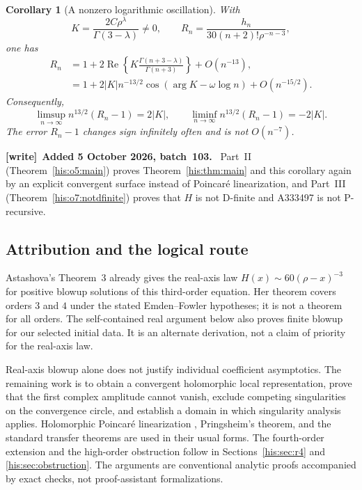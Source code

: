\documentclass[11pt]{article}
\newtheorem{corollary}[theorem]{Corollary}
\theoremstyle{remark}\newtheorem{remark}[theorem]{Remark}
\DeclareMathOperator{\Rea}{Re}
\newcommand{\la}{\lambda}
\numberwithin{equation}{section}
\newenvironment{writenote}[1][]{\par\smallskip\begingroup\small
 \noindent\textbf{[write]}\if\relax\detokenize{#1}\relax\else~\textbf{#1.}\fi\ }%
 {\par\endgroup\smallskip}
\begin{document}
\begin{corollary}[A nonzero logarithmic oscillation]\label{his:cor:oscillation}
With
\begin{equation}\label{his:eq:K}
 K=\frac{2C\rho^\la}{\Gamma(3-\la)}\ne0,\qquad
 R_n=\frac{h_n}{30(n+2)!\rho^{-n-3}},
\end{equation}
one has
\begin{align}
 R_n&=1+2\Rea\left\{K\frac{\Gamma(n+3-\la)}{\Gamma(n+3)}\right\}
       +O(n^{-13}),\label{his:eq:first-exact}\\
 &=1+2|K|n^{-13/2}\cos(\arg K-\omega\log n)
       +O(n^{-15/2}).\label{his:eq:first-simple}
\end{align}
Consequently,
\begin{equation}\label{his:eq:limsup}
 \limsup_{n\to\infty}n^{13/2}(R_n-1)=2|K|,
 \qquad
 \liminf_{n\to\infty}n^{13/2}(R_n-1)=-2|K|.
\end{equation}
The error $R_n-1$ changes sign infinitely often and is not $O(n^{-7})$.
\end{corollary}
\begin{writenote}[Added 5 October 2026, batch~103]
Part~II (Theorem~\ref{his:o5:main}) proves Theorem~\ref{his:thm:main} and this corollary again by an explicit convergent surface instead of Poincar\'e linearization, and Part~III (Theorem~\ref{his:o7:notdfinite}) proves that $H$ is not D-finite and A333497 is not P-recursive.
\end{writenote}


\subsection{Attribution and the logical route}
Astashova's Theorem~3 \cite{astashova2013} already gives the real-axis law
$H(x)\sim60(\rho-x)^{-3}$ for positive blowup solutions of this third-order equation. Her theorem covers orders $3$ and $4$ under the stated Emden--Fowler hypotheses; it is not a theorem for all orders. The self-contained real argument below also proves finite blowup for our selected initial data. It is an alternate derivation, not a claim of priority for the real-axis law.

Real-axis blowup alone does not justify individual coefficient asymptotics. The remaining work is to obtain a convergent holomorphic local representation, prove that the first complex amplitude cannot vanish, exclude competing singularities on the convergence circle, and establish a domain in which singularity analysis applies. Holomorphic Poincar\'e linearization \cite{iy2008}, Pringsheim's theorem, and the standard transfer theorems \cite{fs2009} are used in their usual forms. The fourth-order extension and the high-order obstruction follow in Sections~\ref{his:sec:r4} and \ref{his:sec:obstruction}. The arguments are conventional analytic proofs accompanied by exact checks, not proof-assistant formalizations.
\end{document}
